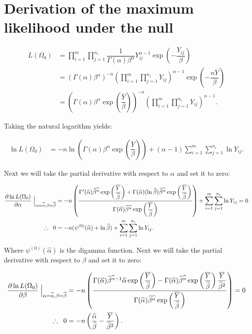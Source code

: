 \documentclass[12pt,a4paper]{article}
\newcommand{\ovY}{\overline{Y}}
\newcommand{\wal}{\widehat{\alpha}}
\newcommand{\wbe}{\widehat{\beta}}
\newcommand{\expy}{\exp\left(\dfrac{\overline{Y}}{\wbe}\right)}
\begin{document}
	\section{Derivation of the maximum likelihood under the null}
	\begin{align}
		L(\Omega_0) &= \prod_{i=1}^m \prod_{j=1}^{n_i} \dfrac{1}{\Gamma(\alpha)\beta^{\alpha}} Y_{ij}^{\alpha-1} \exp{\left(-\dfrac{Y_{ij}}{\beta}\right)} \nonumber \\
		&= (\Gamma(\alpha)\beta^{\alpha})^{-n} \left(\prod_{i=1}^m \prod_{j=1}^{n_i} Y_{ij}\right)^{\alpha-1} \exp{\left(-\dfrac{n\overline{Y}}{\beta}\right)} \nonumber \\
		&= \left(\Gamma(\alpha)\beta^{\alpha}\exp\left(\dfrac{\overline{Y}}{\beta}\right)\right)^{-n} \left(\prod_{i=1}^m \prod_{j=1}^{n_i} Y_{ij}\right)^{\alpha-1}. \label{LikNull}
	\end{align}

	Taking the natural logarithm yields:
	
	\begin{align*}
		\ln{L(\Omega_0)} &= -n\ln{\left(\Gamma(\alpha)\beta^{\alpha}\exp\left(\dfrac{\overline{Y}}{\beta}\right)\right)} + (\alpha-1)\sum_{i=1}^m \sum_{j=1}^{n_i} \ln{Y_{ij}}.
	\end{align*}

	Next we will take the partial derivative with respect to $\alpha$ and set it to zero:
	
	\begin{align}
		\dfrac{\partial \ln{L(\Omega_0)}}{\partial \alpha} \Bigm\lvert_{\alpha=\widehat{\alpha}, \beta=\widehat{\beta}} &= -n \left(\dfrac{\Gamma'(\wal)\wbe^{\wal}\exp\left(\dfrac{\overline{Y}}{\wbe}\right) + \Gamma(\wal)(\ln{\wbe})\wbe^{\wal}\exp\left(\dfrac{\overline{Y}}{\wbe}\right)}{\Gamma(\wal)\wbe^{\wal}\exp\left(\dfrac{\overline{Y}}{\wbe}\right)}\right) + \sum_{i=1}^{m} \sum_{j=1}^{n_i} \ln{Y_{ij}} =0 \nonumber \\
		\therefore\hspace{0.2cm} 0 &= -n(\psi^{(0)}(\wal)+\ln{\wbe}) + \sum_{i=1}^{m} \sum_{j=1}^{n_i} \ln{Y_{ij}}. \label{MLENullAlpha}
	\end{align}

	Where $\psi^{(0)}(\wal)$ is the digamma function. Next we will take the partial derivative with respect to $\beta$ and set it to zero:
	
	\begin{align}
		\dfrac{\partial \ln{L(\Omega_0)}}{\partial \beta}\Bigm \lvert_{\alpha=\widehat{\alpha}, \beta=\widehat{\beta}} &= -n\left(\dfrac{\Gamma(\wal)\wbe^{\wal-1}\wal\expy - \Gamma(\wal)\wbe^{\wal}\expy \dfrac{\overline{Y}}{\wbe^2}}{\Gamma(\wal)\wbe^{\wal}\expy}\right) = 0 \nonumber\\
		\therefore \hspace{0.2cm} 0 &= -n\left(\dfrac{\wal}{\wbe}-\dfrac{\ovY}{\wbe^2}\right). \label{MLENullBeta}
	\end{align}
\end{document}
